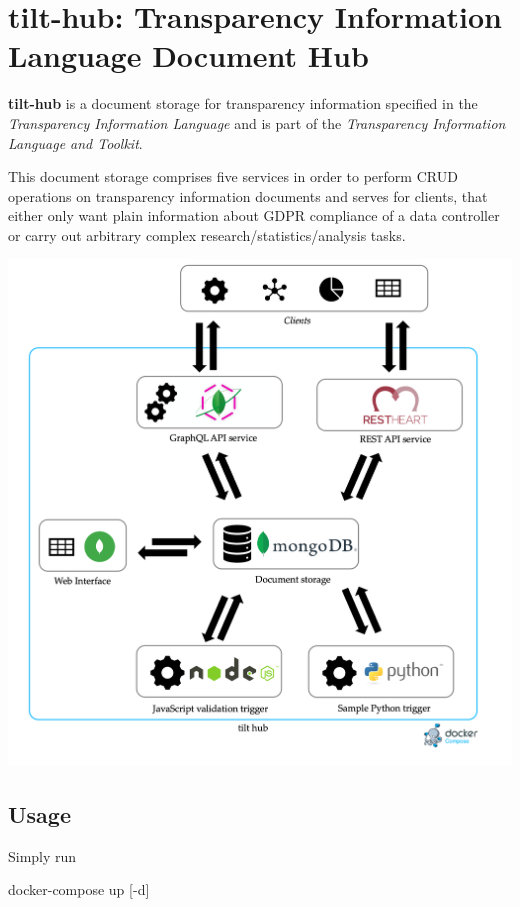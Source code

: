 \documentclass[
]{article}
\author{}
\date{}
\newenvironment{Shaded}{}{}
\newcommand{\ExtensionTok}[1]{#1}
\newcommand{\NormalTok}[1]{#1}
\begin{document}
\hypertarget{tilt-hub-transparency-information-language-document-hub}{%
\section{tilt-hub: Transparency Information Language Document
Hub}\label{tilt-hub-transparency-information-language-document-hub}}

\textbf{tilt-hub} is a document storage for transparency information
specified in the \emph{Transparency Information Language} and is part of
the \emph{Transparency Information Language and Toolkit}.

This document storage comprises five services in order to perform CRUD
operations on transparency information documents and serves for clients,
that either only want plain information about GDPR compliance of a data
controller or carry out arbitrary complex research/statistics/analysis
tasks.

\includegraphics{docs/tilt-hub.png}

\hypertarget{usage}{%
\subsection{Usage}\label{usage}}

Simply run

\begin{Shaded}
\begin{Highlighting}[]
\ExtensionTok{docker{-}compose}\NormalTok{ up [{-}d]}
\end{Highlighting}
\end{Shaded}
\end{document}

